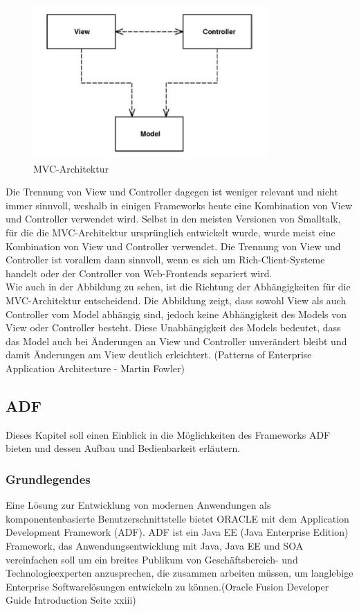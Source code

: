 \begin{figure}[h]
\centering
\includegraphics[width=0.80\textwidth]{img/MVC-Allgemein(Fowler).png}
\caption {MVC-Architektur}
\end{figure}
Die Trennung von View und Controller dagegen ist weniger relevant und nicht immer sinnvoll, weshalb in einigen Frameworks heute eine Kombination von View und Controller verwendet wird. Selbst in den meisten Versionen von Smalltalk, für die die MVC-Architektur ursprünglich entwickelt wurde, wurde meist eine Kombination von View und Controller verwendet. Die Trennung von View und Controller ist vorallem dann sinnvoll, wenn es sich um Rich-Client-Systeme handelt oder der Controller von Web-Frontends separiert wird.\\
Wie auch in der Abbildung zu sehen, ist die Richtung der Abhängigkeiten für die MVC-Architektur entscheidend. Die Abbildung zeigt, dass sowohl View als auch Controller vom Model abhängig sind, jedoch keine Abhängigkeit des Models von View oder Controller besteht. Diese Unabhängigkeit des Models bedeutet, dass das Model auch bei Änderungen an View und Controller unverändert bleibt und damit Änderungen am View deutlich erleichtert.
(Patterns of Enterprise Application Architecture - Martin Fowler)
\subsection{ADF}
Dieses Kapitel soll einen Einblick in die Möglichkeiten des Frameworks ADF bieten und dessen Aufbau und Bedienbarkeit erläutern.

\subsubsection{Grundlegendes}

Eine Lösung zur Entwicklung von modernen Anwendungen als komponentenbasierte Benutzerschnittstelle bietet ORACLE mit dem Application Development Framework (ADF). ADF ist ein Java EE (Java Enterprise Edition) Framework, das Anwendungsentwicklung mit Java, Java EE und SOA vereinfachen soll um ein breites Publikum von Geschäftsbereich- und Technologieexperten anzusprechen, die zusammen arbeiten müssen, um langlebige Enterprise Softwarelösungen entwickeln zu können.(Oracle Fusion Developer Guide Introduction Seite xxiii)
